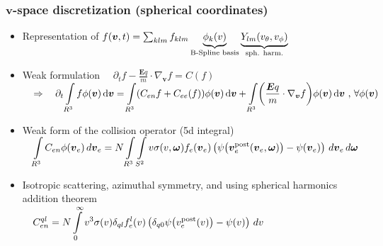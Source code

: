 \documentclass[mathserif, aspectratio=169]{beamer}
\newcommand{\ud}{\,\mathrm{d}}
\newcommand{\vect}[1]{\boldsymbol{#1}}
\newcommand{\of}[1]{\mleft( #1 \mright)}
\newcommand{\myint}{\int\limits}
\newcommand{\diff}[1]{\, d#1}
\begin{document}
\begin{frame}
	\frametitle{$\vect{v}$-space discretization (spherical coordinates)}
	\small
	\begin{itemize}
		\item Representation of $f\of{\vect{v},t} = \sum_{klm} f_{klm} \underbrace{\phi_k\of{v}}_{\text{B-Spline basis}} \underbrace{Y_{lm}\of{v_\theta, v_\phi}}_{\tiny\text{sph. harm.}}$ 
		\item Weak formulation
			$
			\displaystyle
			\quad
			\partial_t f - \frac{\vect{E} q}{m} \cdot \nabla_{\vect{v}}f = C(f)
			\quad $ \\
			$
			\displaystyle
			\quad
			\Rightarrow \quad
			\partial_t \myint_{R^3} f \phi\of{\vect{v}} \ud \vect{v} = 
			\myint_{R^3} \of{C_{en}f + C_{ee}(f)} \phi\of{\vect{v}} \ud \vect{v} + \myint_{R^3} \of{\frac{\vect{E} q}{m} \cdot \nabla_{\vect{v}} f} \phi(\vect{v}) \ud \vect{v}\text{ , } 
			\forall \phi(\vect{v})$
		\item Weak form of the collision operator (5d integral) \\
			$
			\displaystyle
			\quad 
			\myint_{R^3} C_{en} \phi\of{\vect{v}_e} \diff{\vect{v}_e} 
			=
			N \myint_{R^3} \myint_{S^2} 
			v\sigma(v,\vect{\omega})
			f_e\of{\vect{v}_e}
			\left(
			\psi\of{\vect{v}_e^\text{post}\of{\vect{v}_e, \vect{\omega}}} 
			- \psi\of{\vect{v}_e} 
			\right)
			\diff{\vect{v}_e} \diff{\vect{\omega}}
			$
		\item Isotropic scattering, azimuthal symmetry, and using spherical harmonics addition theorem\\
		$
		\displaystyle
		\quad 
		C_{en}^{ql} 
		=
		N \myint_{0}^{\infty} 
		v^3\sigma(v)\delta_{ql}
		f_e^{l}\of{v}
		\left(
		\delta_{q0}\psi\of{v_e^\text{post}\of{v}} - \psi\of{v} 
		\right)
		\diff{v} 
		$ 
	\end{itemize}
\end{frame}
\end{document}
